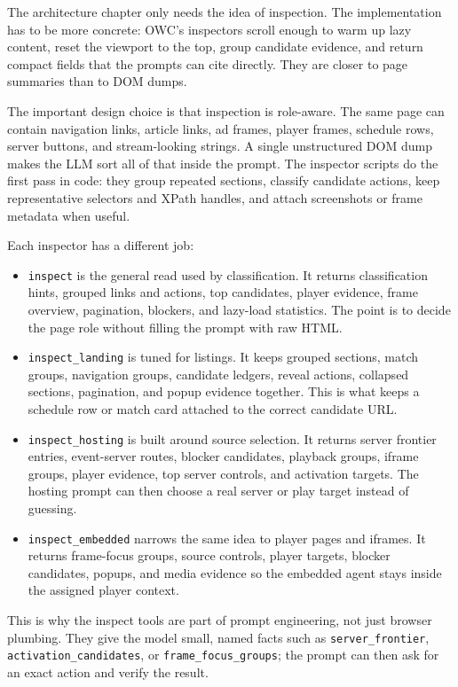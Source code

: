 The architecture chapter only needs the idea of inspection. The implementation has to be
more concrete: OWC's inspectors scroll enough to warm up lazy content, reset the viewport
to the top, group candidate evidence, and return compact fields that the prompts can cite
directly. They are closer to page summaries than to DOM dumps.

The important design choice is that inspection is role-aware. The same page can contain
navigation links, article links, ad frames, player frames, schedule rows, server buttons,
and stream-looking strings. A single unstructured DOM dump makes the LLM sort all of that
inside the prompt. The inspector scripts do the first pass in code: they group repeated
sections, classify candidate actions, keep representative selectors and XPath handles,
and attach screenshots or frame metadata when useful.

Each inspector has a different job:
\begin{itemize}
  \item \texttt{inspect} is the general read used by classification. It returns
  classification hints, grouped links and actions, top candidates, player evidence, frame
  overview, pagination, blockers, and lazy-load statistics. The point is to decide the
  page role without filling the prompt with raw HTML.
  \item \texttt{inspect\_landing} is tuned for listings. It keeps grouped sections,
  match groups, navigation groups, candidate ledgers, reveal actions, collapsed sections,
  pagination, and popup evidence together. This is what keeps a schedule row or match
  card attached to the correct candidate URL.
  \item \texttt{inspect\_hosting} is built around source selection. It returns server
  frontier entries, event-server routes, blocker candidates, playback groups, iframe
  groups, player evidence, top server controls, and activation targets. The hosting
  prompt can then choose a real server or play target instead of guessing.
  \item \texttt{inspect\_embedded} narrows the same idea to player pages and iframes. It
  returns frame-focus groups, source controls, player targets, blocker candidates,
  popups, and media evidence so the embedded agent stays inside the assigned player
  context.
\end{itemize}

This is why the inspect tools are part of prompt engineering, not just browser plumbing.
They give the model small, named facts such as \texttt{server\_frontier},
\texttt{activation\_candidates}, or \texttt{frame\_focus\_groups}; the prompt can then
ask for an exact action and verify the result.

